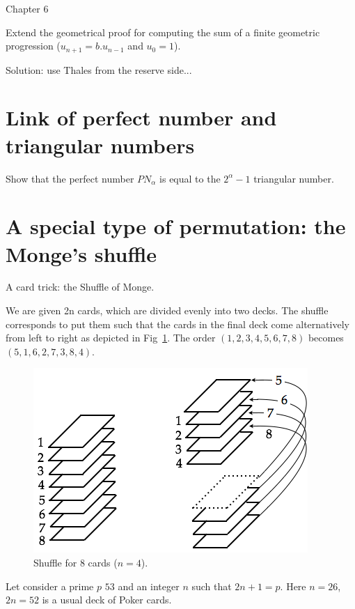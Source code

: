 \documentclass{article}[12pt]
\begin{document}
Chapter 6

Extend the geometrical proof for computing the sum of a finite geometric progression ($u_{n+1} = b.u_{n-1}$
and $u_0=1$). 

Solution: use Thales from the reserve side...


\section{Link of perfect number and triangular numbers}

Show that the perfect number $PN_\alpha$ is equal to the $2^\alpha-1$ triangular number.


\section{A special type of permutation: the Monge's shuffle}

A card trick: the Shuffle of Monge.
\bigskip

We are given 2n cards, which are divided evenly into two decks. 
The shuffle corresponds to put them such that the cards in the final deck come alternatively from left to right as depicted 
in Fig~\ref{fig:suffleMonge}.
The order $(1,2,3,4,5,6,7,8)$ becomes $(5,1,6,2,7,3,8,4)$.
\begin{figure}[h]
\begin{center}
        \includegraphics[scale=0.5]{FiguresArithmetic/suffleMonge} 
        \caption{Shuffle for $8$ cards ($n=4$).}
        \label{fig:suffleMonge}
\end{center}
\end{figure}


Let consider a prime $p$ $53$ and an integer $n$ such that $2n+1=p$.
Here $n=26$, $2n=52$ is a usual deck of Poker cards. 
\end{document}

